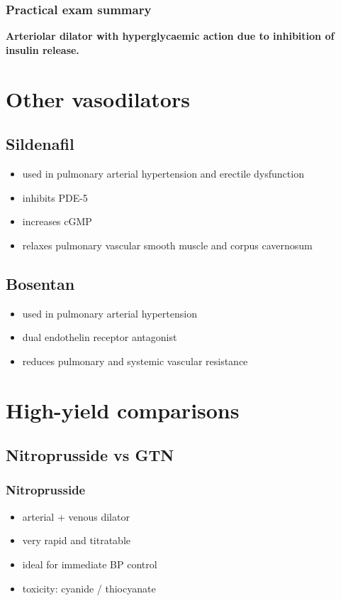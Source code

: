 \documentclass[11pt,a4paper]{article}
\begin{document}
\subsubsection*{Practical exam summary}

\textbf{Arteriolar dilator with hyperglycaemic action due to inhibition of insulin release.}

\section{Other vasodilators}

\subsection{Sildenafil}
\begin{itemize}
    \item used in pulmonary arterial hypertension and erectile dysfunction
    \item inhibits PDE-5
    \item increases cGMP
    \item relaxes pulmonary vascular smooth muscle and corpus cavernosum
\end{itemize}

\subsection{Bosentan}
\begin{itemize}
    \item used in pulmonary arterial hypertension
    \item dual endothelin receptor antagonist
    \item reduces pulmonary and systemic vascular resistance
\end{itemize}

\section{High-yield comparisons}

\subsection{Nitroprusside vs GTN}

\subsubsection*{Nitroprusside}
\begin{itemize}
    \item arterial + venous dilator
    \item very rapid and titratable
    \item ideal for immediate BP control
    \item toxicity: cyanide / thiocyanate
\end{itemize}
\end{document}
